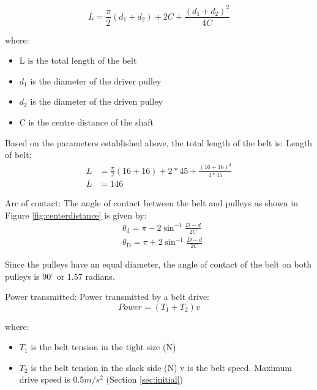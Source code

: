 \begin{equation} \label{eu_eqn}
L = \frac{\pi}{2}(d_1 + d_2) + 2C + \frac{(d_1 + d_2)^2}{4C}
\end{equation}

where: 
\begin{itemize}
\item L is the total length of the belt
\item \(d_1\)  is the diameter of the driver pulley
\item \(d_2\)  is the diameter of the driven pulley
\item C is the centre distance of the shaft
\end{itemize}

Based on the parameters established above, the total length of the belt is: 
Length of belt:
\begin{equation} \label{eu_eqn}
    \begin{aligned}
        L &= \frac{\pi}{2}(16 + 16) + 2*45 + \frac{(16 + 16)^2}{4*45}\\
        L& = 146
    \end{aligned}
\end{equation}

Arc of contact:
The angle of contact between the belt and pulleys as shown in Figure \ref{fig:centerdistance} is given by:
\begin{equation} \label{eqn4}
    \begin{aligned}
        &\theta_{\mathrm{d}}=\pi-2 \sin ^{-1} \frac{D-d}{2 C} \\
        &\theta_{\mathrm{D}}=\pi+2 \sin ^{-1} \frac{D-d}{2 C}
    \end{aligned}
\end{equation}


Since the pulleys have an equal diameter, the angle of contact of the belt on both pulleys is 90$^{\circ}$  or 1.57 radians.

Power transmitted:
Power transmitted by a belt drive:
\begin{equation}
    Power = (T_1 + T_2)v
\end{equation}

where:
\begin{itemize}
    \item \(T_1\) is the belt tension in the tight size (N)
    \item \(T_2\) is the belt tension in the slack side (N)
    v is the belt speed. Maximum drive speed is 0.5\(m/s^2\) (Section \ref{sec:initial})
\end{itemize}


